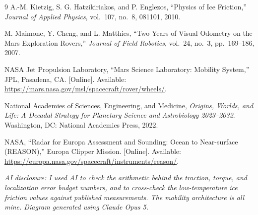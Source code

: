 \documentclass[11pt]{article}
\begin{document}
\begin{thebibliography}{9}
 A.-M. Kietzig, S. G. Hatzikiriakos, and P. Englezos, ``Physics of Ice Friction,''
\textit{Journal of Applied Physics}, vol.\ 107, no.\ 8, 081101, 2010.

 M. Maimone, Y. Cheng, and L. Matthies, ``Two Years of Visual Odometry on the Mars Exploration
Rovers,'' \textit{Journal of Field Robotics}, vol.\ 24, no.\ 3, pp.\ 169--186, 2007.

 NASA Jet Propulsion Laboratory, ``Mars Science Laboratory: Mobility System,'' JPL, Pasadena, CA.
[Online]. Available: \url{https://mars.nasa.gov/msl/spacecraft/rover/wheels/}.

 National Academies of Sciences, Engineering, and Medicine, \textit{Origins, Worlds, and Life: A
Decadal Strategy for Planetary Science and Astrobiology 2023--2032}. Washington, DC: National Academies Press,
2022.

 NASA, ``Radar for Europa Assessment and Sounding: Ocean to Near-surface (REASON),'' Europa
Clipper Mission. [Online]. Available: \url{https://europa.nasa.gov/spacecraft/instruments/reason/}.
\end{thebibliography}

\bigskip

\noindent\footnotesize\textit{AI disclosure: I used AI to check the arithmetic behind the traction, torque, and
localization error budget numbers, and to cross-check the low-temperature ice friction values against published
measurements. The mobility architecture is all mine. Diagram generated using Claude Opus 5.}
\end{document}
